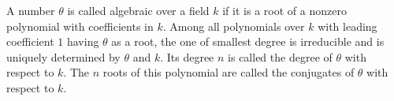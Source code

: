 A number $\theta$ is called algebraic over a field $k$ if it is a root of a nonzero polynomial with coefficients in $k$. Among all polynomials over $k$ with leading coefficient $1$ having $\theta$ as a root, the one of smallest degree is irreducible and is uniquely determined by $\theta$ and $k$. Its degree $n$ is called the degree of $\theta$ with respect to $k$. The $n$ roots of this polynomial are called the conjugates of $\theta$ with respect to $k$.
